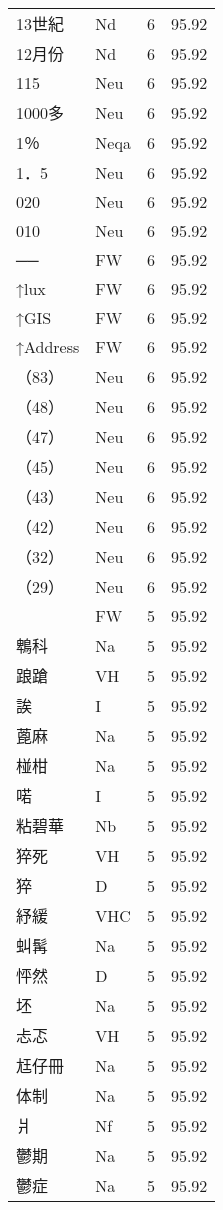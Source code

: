 \documentclass[twocolumn]{book}
\begin{document}
\begin{supertabular}{llrr}
13世紀 & Nd & 6 &  95.92\\
12月份 & Nd & 6 &  95.92\\
115 & Neu & 6 &  95.92\\
1000多 & Neu & 6 &  95.92\\
1％ & Neqa & 6 &  95.92\\
1．5 & Neu & 6 &  95.92\\
020 & Neu & 6 &  95.92\\
010 & Neu & 6 &  95.92\\
── & FW & 6 &  95.92\\
↑lux & FW & 6 &  95.92\\
↑GIS & FW & 6 &  95.92\\
↑Address & FW & 6 &  95.92\\
（83） & Neu & 6 &  95.92\\
（48） & Neu & 6 &  95.92\\
（47） & Neu & 6 &  95.92\\
（45） & Neu & 6 &  95.92\\
（43） & Neu & 6 &  95.92\\
（42） & Neu & 6 &  95.92\\
（32） & Neu & 6 &  95.92\\
（29） & Neu & 6 &  95.92\\
 & FW & 5 &  95.92\\
鵯科 & Na & 5 &  95.92\\
踉蹌 & VH & 5 &  95.92\\
誒 & I & 5 &  95.92\\
蓖麻 & Na & 5 &  95.92\\
椪柑 & Na & 5 &  95.92\\
喏 & I & 5 &  95.92\\
粘碧華 & Nb & 5 &  95.92\\
猝死 & VH & 5 &  95.92\\
猝 & D & 5 &  95.92\\
紓緩 & VHC & 5 &  95.92\\
虯髯 & Na & 5 &  95.92\\
怦然 & D & 5 &  95.92\\
坯 & Na & 5 &  95.92\\
忐忑 & VH & 5 &  95.92\\
尪仔冊 & Na & 5 &  95.92\\
体制 & Na & 5 &  95.92\\
爿 & Nf & 5 &  95.92\\
鬱期 & Na & 5 &  95.92\\
鬱症 & Na & 5 &  95.92\\

\end{supertabular}
\end{document}
